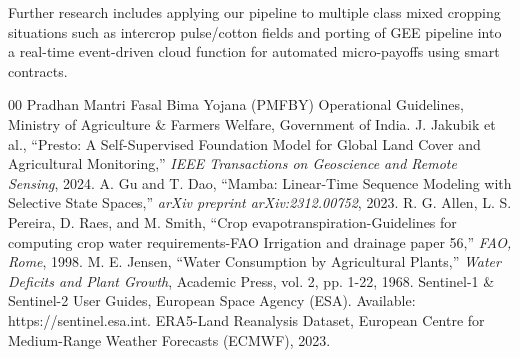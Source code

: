 \documentclass[conference]{IEEEtran}
\begin{document}
Further research includes applying our pipeline to multiple class mixed cropping situations such as intercrop pulse/cotton fields and porting of GEE pipeline into a real-time event-driven cloud function for automated micro-payoffs using smart contracts.

\begin{thebibliography}{00}
 Pradhan Mantri Fasal Bima Yojana (PMFBY) Operational Guidelines, Ministry of Agriculture \& Farmers Welfare, Government of India.
 J. Jakubik et al., ``Presto: A Self-Supervised Foundation Model for Global Land Cover and Agricultural Monitoring,'' \emph{IEEE Transactions on Geoscience and Remote Sensing}, 2024.
 A. Gu and T. Dao, ``Mamba: Linear-Time Sequence Modeling with Selective State Spaces,'' \emph{arXiv preprint arXiv:2312.00752}, 2023.
 R. G. Allen, L. S. Pereira, D. Raes, and M. Smith, ``Crop evapotranspiration-Guidelines for computing crop water requirements-FAO Irrigation and drainage paper 56,'' \emph{FAO, Rome}, 1998.
 M. E. Jensen, ``Water Consumption by Agricultural Plants,'' \emph{Water Deficits and Plant Growth}, Academic Press, vol. 2, pp. 1-22, 1968.
 Sentinel-1 \& Sentinel-2 User Guides, European Space Agency (ESA). Available: https://sentinel.esa.int.
 ERA5-Land Reanalysis Dataset, European Centre for Medium-Range Weather Forecasts (ECMWF), 2023.
\end{thebibliography}
\end{document}
